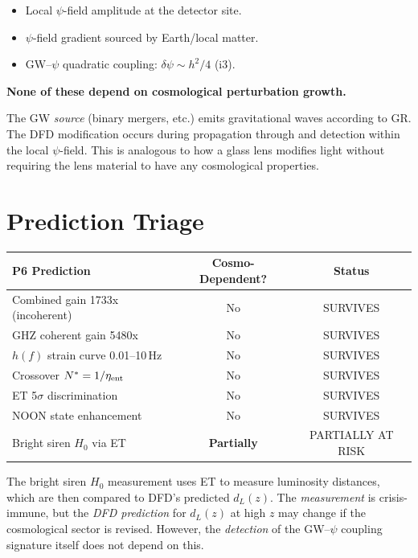 \documentclass[11pt]{article}
\begin{document}
\begin{itemize}
\item Local $\psi$-field amplitude at the detector site.
\item $\psi$-field gradient sourced by Earth/local matter.
\item GW--$\psi$ quadratic coupling: $\delta\psi \sim h^2/4$ (i3).
\end{itemize}

\textbf{None of these depend on cosmological perturbation growth.}

The GW \emph{source} (binary mergers, etc.) emits gravitational waves
according to GR. The DFD modification occurs during propagation through
and detection within the local $\psi$-field. This is analogous to how
a glass lens modifies light without requiring the lens material to have
any cosmological properties.

\section{Prediction Triage}

\begin{table}[h]
\centering
\begin{tabular}{lcc}
\toprule
\textbf{P6 Prediction} & \textbf{Cosmo-Dependent?} & \textbf{Status} \\
\midrule
Combined gain 1733x (incoherent) & No & SURVIVES \\
GHZ coherent gain 5480x & No & SURVIVES \\
$h(f)$ strain curve 0.01--10\,Hz & No & SURVIVES \\
Crossover $N^* = 1/\eta_{\rm ent}$ & No & SURVIVES \\
ET 5$\sigma$ discrimination & No & SURVIVES \\
NOON state enhancement & No & SURVIVES \\
Bright siren $H_0$ via ET & \textbf{Partially} & PARTIALLY AT RISK \\
\bottomrule
\end{tabular}
\end{table}

The bright siren $H_0$ measurement uses ET to measure luminosity
distances, which are then compared to DFD's predicted $d_L(z)$.
The \emph{measurement} is crisis-immune, but the \emph{DFD prediction}
for $d_L(z)$ at high $z$ may change if the cosmological sector is
revised. However, the \emph{detection} of the GW--$\psi$ coupling
signature itself does not depend on this.
\end{document}
